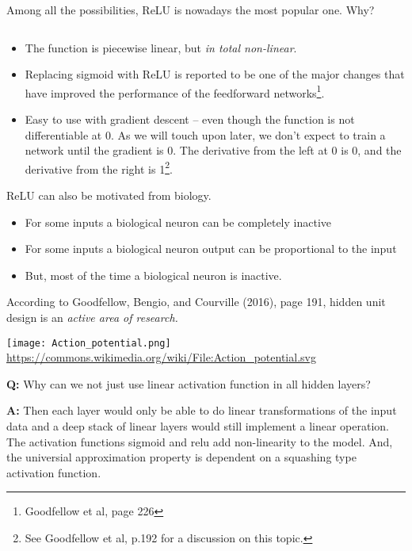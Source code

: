 \documentclass[10pt,ignorenonframetext,]{beamer}
\providecommand{\tightlist}{%
  \setlength{\itemsep}{0pt}\setlength{\parskip}{0pt}}
\begin{document}
\begin{frame}

Among all the possibilities, ReLU is nowadays the most popular one. Why?

\(~\)

\begin{itemize}
\item
  The function is piecewise linear, but \emph{in total non-linear}.
\item
  Replacing sigmoid with ReLU is reported to be one of the major changes
  that have improved the performance of the feedforward
  networks\footnote{Goodfellow et al, page 226}.
\item
  Easy to use with gradient descent -- even though the function is not
  differentiable at 0. As we will touch upon later, we don't expect to
  train a network until the gradient is 0. The derivative from the left
  at 0 is 0, and the derivative from the right is
  1\footnote{See Goodfellow et al, p.192 for a discussion on this topic.}.
\end{itemize}

\end{frame}

\begin{frame}

ReLU can also be motivated from biology.

\begin{itemize}
\tightlist
\item
  For some inputs a biological neuron can be completely inactive
\item
  For some inputs a biological neuron output can be proportional to the
  input
\item
  But, most of the time a biological neuron is inactive.
\end{itemize}

According to Goodfellow, Bengio, and Courville (2016), page 191, hidden
unit design is an \emph{active area of research.}

\centering
\texttt{[image: Action\_potential.png]}
\small
\url{https://commons.wikimedia.org/wiki/File:Action_potential.svg}

\end{frame}

\begin{frame}

\textbf{Q:} Why can we not just use linear activation function in all
hidden layers?

\textbf{A:} Then each layer would only be able to do linear
transformations of the input data and a deep stack of linear layers
would still implement a linear operation. The activation functions
sigmoid and relu add non-linearity to the model. And, the universial
approximation property is dependent on a squashing type activation
function.

\end{frame}
\end{document}
